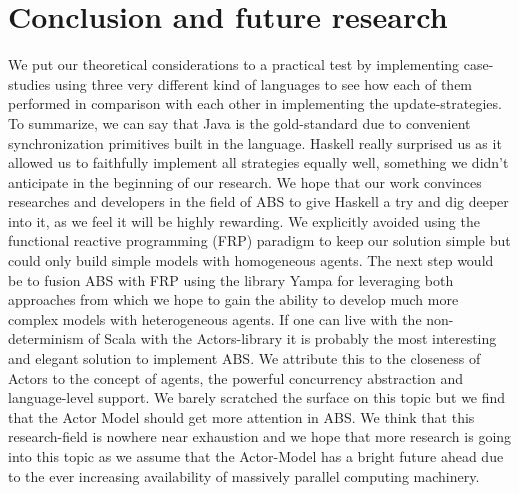 \section{Conclusion and future research}
We put our theoretical considerations to a practical test by implementing case-studies using three very different kind of languages to see how each of them performed in comparison with each other in implementing the update-strategies. To summarize, we can say that Java is the gold-standard due to convenient synchronization primitives built in the language. Haskell really surprised us as it allowed us to faithfully implement all strategies equally well, something we didn't anticipate in the beginning of our research. We hope that our work convinces researches and developers in the field of ABS to give Haskell a try and dig deeper into it, as we feel it will be highly rewarding. We explicitly avoided using the functional reactive programming (FRP) paradigm to keep our solution simple but could only build simple models with homogeneous agents. The next step would be to fusion ABS with FRP using the library Yampa for leveraging both approaches from which we hope to gain the ability to develop much more complex models with heterogeneous agents. 
If one can live with the non-determinism of Scala with the Actors-library it is probably the most interesting and elegant solution to implement ABS. We attribute this to the closeness of Actors to the concept of agents, the powerful concurrency abstraction and language-level support. We barely scratched the surface on this topic but we find that the Actor Model should get more attention in ABS. We think that this research-field is nowhere near exhaustion and we hope that more research is going into this topic as we assume that the Actor-Model has a bright future ahead due to the ever increasing availability of massively parallel computing machinery.